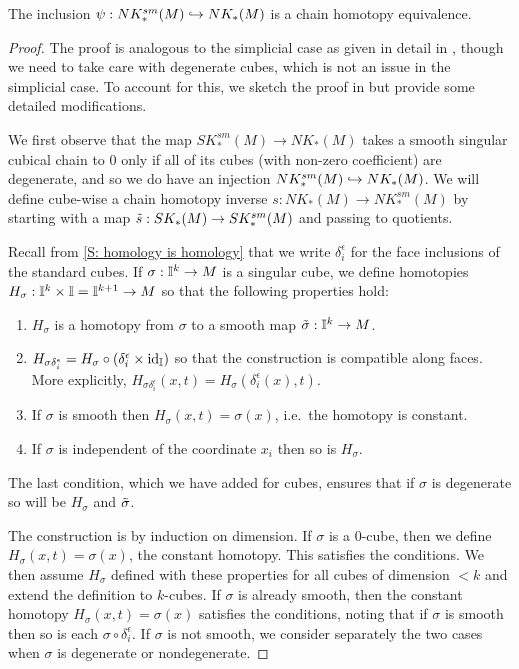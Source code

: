 \begin{proposition}\label{P: singular smooth cubes}
The inclusion $\psi: NK^{sm}_*(M)\hookrightarrow NK_*(M)$ is a chain homotopy equivalence.
\end{proposition}
\begin{proof}
The proof is analogous to the simplicial case as given in detail in \cite[Theorem 18.7]{Lee13}, though we need to take care with degenerate cubes, which is not an issue in the simplicial case. To account for this, we sketch the proof in \cite{Lee13} but provide some detailed modifications.

We first observe that the map $SK^{sm}_*(M)\to NK_*(M)$ takes a smooth singular cubical chain to $0$ only if all of its cubes (with non-zero coefficient) are degenerate, and so we do have an injection $NK^{sm}_*(M)\hookrightarrow NK_*(M)$. We will define cube-wise a chain homotopy inverse  $s:NK_*(M)\to NK^{sm}_*(M)$ by starting with a map $\tilde s:SK_*(M)\to SK^{sm}_*(M)$ and passing to quotients.

Recall from \cref{S: homology is homology} that we write $\delta_i^\epsilon$ for the face inclusions of the standard cubes. If $\sigma:\mathbb{I}^k\to M$ is a singular cube, we define homotopies $H_\sigma:\mathbb{I}^k\times \mathbb{I}=\mathbb{I}^{k+1}\to M$ so that the following properties hold:
\begin{enumerate}
\item\label{I: smooth} $H_\sigma$ is a homotopy from $\sigma$ to a smooth map $\tilde \sigma:\mathbb{I}^k\to M$.

\item\label{I: faces} $H_{\sigma \delta_i^\epsilon}=H_\sigma\circ (\delta_i^\epsilon\times \mathrm{id}_{\mathbb{I}})$ so that the construction is compatible along faces. More explicitly, $H_{\sigma \delta_i^\epsilon}(x,t)=H_\sigma(\delta_i^\epsilon(x),t)$.

\item If $\sigma$ is smooth then $H_{\sigma}(x,t)=\sigma(x)$, i.e.\ the homotopy is constant.

\item\label{I: degen} If $\sigma$ is independent of the coordinate $x_i$ then so is $H_\sigma$.
\end{enumerate}

The last condition, which we have added for cubes,  ensures that if $\sigma$ is degenerate so will be $H_\sigma$ and $\tilde \sigma$.

The construction is by induction on dimension. If $\sigma$ is a $0$-cube, then we define $H_\sigma(x,t)=\sigma(x)$, the constant homotopy. This satisfies the conditions. We then assume $H_\sigma$ defined with these properties for all cubes of dimension $<k$ and extend the definition to $k$-cubes. If $\sigma$ is already smooth, then the constant homotopy $H_\sigma(x,t)=\sigma(x)$ satisfies the conditions, noting that if $\sigma$ is smooth then so is each $\sigma\circ \delta_i^\epsilon$. If $\sigma$ is not smooth, we consider separately the two cases when $\sigma$ is degenerate or nondegenerate.


\end{proof}
